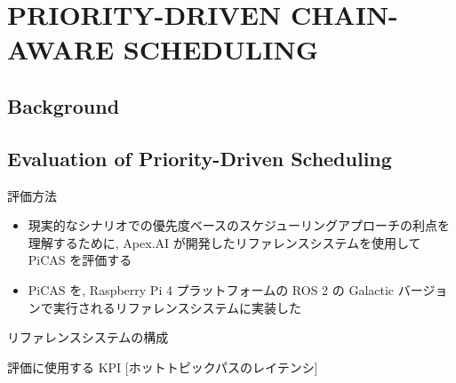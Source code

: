 
\section{PRIORITY-DRIVEN CHAIN-AWARE SCHEDULING}
\label{sec: priority-driven chain-aware scheduling}

\subsection{Background}
\label{ssec: background}

\begin{frame}{}
    \LARGE\centering{}
\end{frame}


\subsection{Evaluation of Priority-Driven Scheduling}
\label{ssec: evaluation of priority-driven scheduling}

\begin{frame}{評価方法}
    \begin{itemize}
        \item 現実的なシナリオでの優先度ベースのスケジューリングアプローチの利点を理解するために, Apex.AI が開発したリファレンスシステムを使用して PiCAS を評価する
        \item PiCAS を, Raspberry Pi 4 プラットフォームの ROS 2 の Galactic バージョンで実行されるリファレンスシステムに実装した
    \end{itemize}
\end{frame}

\begin{frame}{リファレンスシステムの構成}
\end{frame}

\begin{frame}{評価に使用する KPI [ホットトピックパスのレイテンシ]}
\end{frame}

